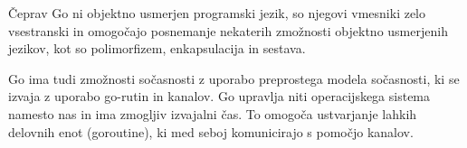\documentclass[a4paper, 12pt]{book}
\begin{document}
Čeprav Go ni objektno usmerjen programski jezik, so njegovi vmesniki zelo vsestranski in omogočajo posnemanje nekaterih zmožnosti objektno usmerjenih jezikov, kot so polimorfizem, enkapsulacija in sestava.

Go ima tudi zmožnosti sočasnosti z uporabo preprostega modela sočasnosti, ki se izvaja z uporabo go-rutin in kanalov. Go upravlja niti operacijskega sistema namesto nas in ima zmogljiv izvajalni čas. To omogoča ustvarjanje lahkih delovnih enot (goroutine), ki med seboj komunicirajo s pomočjo kanalov.
 

 






\end{document}
